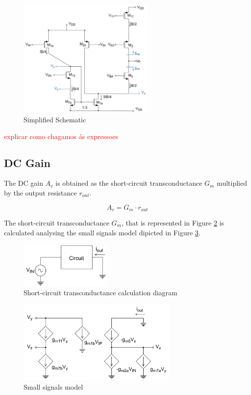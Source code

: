 \begin{figure}[H]
    \centering
    \includegraphics[width=0.6\textwidth]{Images/simplified_sch.png}
    \caption{Simplified Schematic}
    \label{fig:simplified_schematic}
\end{figure}



\textcolor{red}{explicar como chagamos ás expressoes}
\subsection {DC Gain}

The DC gain $A_v$ is obtained as the short-circuit transconductance $G_m$ multiplied by the output resistance $r_{out}$.

$$A_v = G_m \cdot r_{out}$$

The short-circuit transconductance $G_m$, that is represented in Figure \ref{fig:cc_transconductance} is calculated analysing the small signals model dipicted in Figure \ref{fig:small_signals}.

\begin{figure}[H]
    \centering
    \includegraphics[width=0.4\textwidth]{Images/cc_transconductance.png}
    \caption{Short-circuit transconductance calculation diagram}
    \label{fig:cc_transconductance}
\end{figure}

\begin{figure}[H]
    \centering
    \includegraphics[width=0.7\textwidth]{Images/small_signals.png}
    \caption{Small signals model}
    \label{fig:small_signals}
\end{figure}

